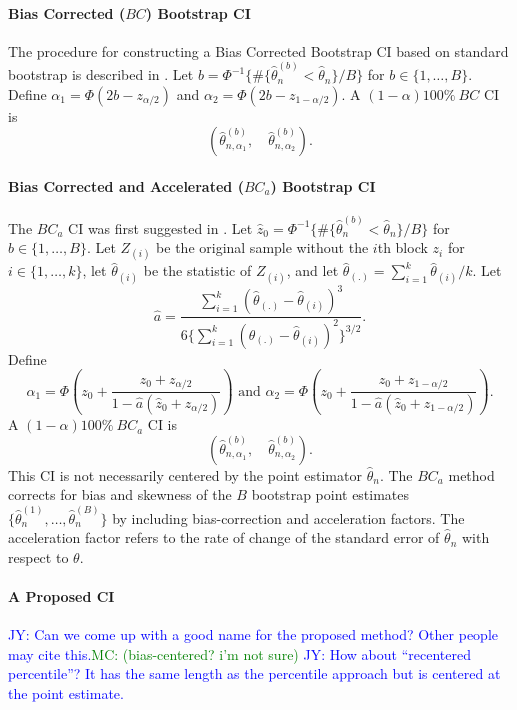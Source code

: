 \documentclass[12pt, letterpaper, titlepage]{article}
\newcommand{\jy}[1]{\textcolor{blue}{JY: #1}}
\newcommand{\mc}[1]{\textcolor{green}{MC: (#1)}}
\begin{document}
\paragraph{Bias Corrected ($BC$) Bootstrap CI}
The procedure for constructing a Bias Corrected Bootstrap CI based on standard
bootstrap is described in \citet{carpenter2000bootstrap}. Let
$b = \Phi^{-1}\{\#\{\hat\theta_n^{(b)} < \hat{\theta}_n\} / B\}$ for
$b \in \{1, \ldots, B\}$. Define $\alpha_1 = \Phi(2b - z_{\alpha/2})$ and 
$\alpha_2 = \Phi(2b - z_{1 - \alpha/2})$. A $(1 - \alpha)100\%~BC$ CI is
\[
(\hat\theta_{n, \alpha_1}^{(b)}, \quad \hat\theta_{n, \alpha_2}^{(b)}).
\]


\paragraph{Bias Corrected and Accelerated ($BC_a$) Bootstrap CI}
The $BC_a$ CI was first suggested in \citet{efron1987better}. Let
$\hat{z}_0 = \Phi^{-1}\{\#\{\hat\theta_n^{(b)} < \hat{\theta}_n\} / B\}$ for
$b \in \{1, \ldots, B\}$. Let $Z_{(i)}$ be the original sample without the
$i$th block $z_i$ for $i \in \{1, \ldots, k\}$, let $\hat{\theta}_{(i)}$ be
the statistic of $Z_{(i)}$, and let
$\hat{\theta}_{(.)} = \sum_{i=1}^{k} \hat{\theta}_{(i)} / k$. 
Let 
\[
\hat{a} = \frac{\sum_{i=1}^{k} (\hat{\theta}_{(.)} -
  \hat{\theta}_{(i)})^3}{6\{\sum_{i=1}^{k} (\hat{\theta}_{(.)} -
  \hat{\theta}_{(i)})^2\}^{3/2}}.
\]
Define
\[
\alpha_1 = \Phi\left(z_0 + \frac{z_{0} +
  z_{\alpha/2}}{1 - \hat{a}(\hat{z}_{0} + z_{\alpha/2})}\right)
\text{ and }
\alpha_2 = \Phi\left(z_0 + \frac{z_{0} +
  z_{1 - \alpha/2}}{1 - \hat{a}(\hat{z}_{0} + z_{1 - \alpha/2})}\right).
\]
A $(1 - \alpha)100\%~BC_a$ CI is
\[
(\hat\theta_{n, \alpha_1}^{(b)}, \quad \hat\theta_{n, \alpha_2}^{(b)}).
\]
This CI is not necessarily centered by the point estimator $\hat\theta_n$. The
$BC_a$ method corrects for bias and skewness of the $B$ bootstrap point
estimates $\{\hat\theta_n^{(1)}, \ldots, \hat\theta_n^{(B)}\}$ by including
bias-correction and acceleration factors. The acceleration factor refers to
the rate of change of the standard error of $\hat\theta_n$ with respect to
$\theta$.


\paragraph{A Proposed CI}
\jy{Can we come up with a good name for the proposed method? Other people may cite this.}\mc{bias-centered? i'm not sure}
\jy{How about ``recentered percentile''? It has the same length as the
  percentile approach but is centered at the point estimate.}
\end{document}
